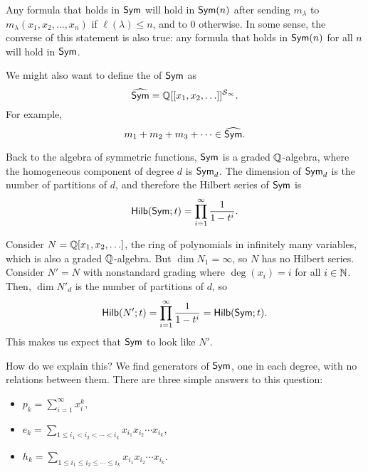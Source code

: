 Any formula that holds in \(\operatorname{\mathsf{Sym}}\) will hold in \(\operatorname{\mathsf{Sym}}(n)\) after sending \(m_\lambda\) to \(m_\lambda(x_1, x_2, \ldots, x_n)\) if \(\ell(\lambda) \leq n\), and to \(0\) otherwise.
In some sense, the converse of this statement is also true: any formula that holds in \(\operatorname{\mathsf{Sym}}(n)\) for all \(n\) will hold in \(\operatorname{\mathsf{Sym}}\).

We might also want to define the  of \(\operatorname{\mathsf{Sym}}\) as
\begin{equation*}
    \widehat{\operatorname{\mathsf{Sym}}} = \mathbb{Q}[[x_1, x_2, \ldots]]^{\operatorname{\mathcal{S}}_\infty}.
\end{equation*}
For example,
\begin{equation*}
    m_1 + m_2 + m_3 + \cdots \in \widehat{\operatorname{\mathsf{Sym}}}.
\end{equation*}

Back to the algebra of symmetric functions,
\(\operatorname{\mathsf{Sym}}\) is a graded \(\mathbb{Q}\)-algebra,
where the homogeneous component of degree \(d\) is \(\operatorname{\mathsf{Sym}}_d\).
The dimension of \(\operatorname{\mathsf{Sym}}_d\) is the number of partitions of \(d\),
and therefore the Hilbert series of \(\operatorname{\mathsf{Sym}}\) is
\begin{equation*}
    \operatorname{\mathsf{Hilb}}(\operatorname{\mathsf{Sym}}; t) = \prod_{i=1}^\infty \frac{1}{1-t^i}.
\end{equation*}

Consider \(N = \mathbb{Q}[x_1, x_2, \ldots]\), the ring of polynomials in infinitely many variables, which is also a graded \(\mathbb{Q}\)-algebra.
But \(\dim N_1 = \infty\), so \(N\) has no Hilbert series.
Consider \(N' = N\) with nonstandard grading where \(\deg(x_i) = i\) for all \(i \in \mathbb{N}\).
Then, \(\dim N'_d\) is the number of partitions of \(d\), so
\begin{equation*}
    \operatorname{\mathsf{Hilb}}(N'; t) = \prod_{i=1}^\infty \frac{1}{1-t^i} = \operatorname{\mathsf{Hilb}}(\operatorname{\mathsf{Sym}}; t).
\end{equation*}
This makes us expect that \(\operatorname{\mathsf{Sym}}\) to look like \(N'\).

How do we explain this? We find generators of \(\operatorname{\mathsf{Sym}}\), one in each degree, with no relations between them.
There are three simple answers to this question:
\begin{itemize}
    \item {} \(p_k = \sum_{i=1}^\infty x_i^k\),
    \item {} \(e_k = \sum_{1 \leq i_1 < i_2 < \cdots < i_k} x_{i_1}x_{i_2}\cdots x_{i_k}\),
    \item {} \(h_k = \sum_{1 \leq i_1 \leq i_2 \leq \cdots \leq i_k} x_{i_1}x_{i_2}\cdots x_{i_k}\).
\end{itemize}

